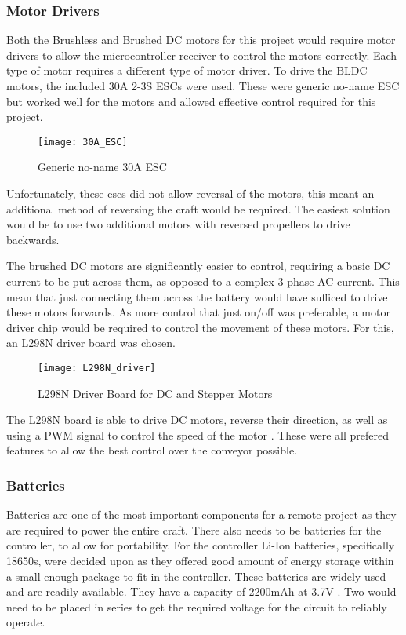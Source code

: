 \documentclass [11pt]{article}
\begin{document}
\subsubsection{Motor Drivers}


Both the Brushless and Brushed DC motors for this project would require motor drivers to allow the microcontroller receiver to control the motors correctly. Each type of motor requires a different type of motor driver. To drive the BLDC motors, the included 30A 2-3S ESCs were used. These were generic no-name ESC but worked well for the motors and allowed effective control required for this project. 

\begin{figure}[H]
\centerline{\texttt{[image: 30A\_ESC]}}
\caption{Generic no-name 30A ESC}
\label{fig:30A_ESC}
\end{figure}

Unfortunately, these \gls{esc}s did not allow reversal of the motors, this meant an additional method of reversing the craft would be required. The easiest solution would be to use two additional motors with reversed propellers to drive backwards.

The brushed DC motors are significantly easier to control, requiring a basic DC current to be put across them, as opposed to a complex 3-phase AC current. This mean that just connecting them across the battery would have sufficed to drive these motors forwards. As more control that just on/off was preferable, a motor driver chip would be required to control the movement of these motors. For this, an L298N driver board was chosen. 

\begin{figure}[H]
\centerline{\texttt{[image: L298N\_driver]}}
\caption{L298N Driver Board for DC and Stepper Motors}
\label{fig:L298N_driver}
\end{figure}

The L298N board is able to drive DC motors, reverse their direction, as well as using a PWM signal to control the speed of the motor \citep{L298N}. These were all prefered features to allow the best control over the conveyor possible. 

\subsubsection{Batteries}

Batteries are one of the most important components for a remote project as they are required to power the entire craft. There also needs to be batteries for the controller, to allow for portability. For the controller Li-Ion batteries, specifically 18650s, were decided upon as they offered good amount of energy storage within a small enough package to fit in the controller. These batteries are widely used and are readily available. They have a capacity of 2200mAh at 3.7V \cite{18650}. Two would need to be placed in series to get the required voltage for the circuit to reliably operate. 
\end{document}
